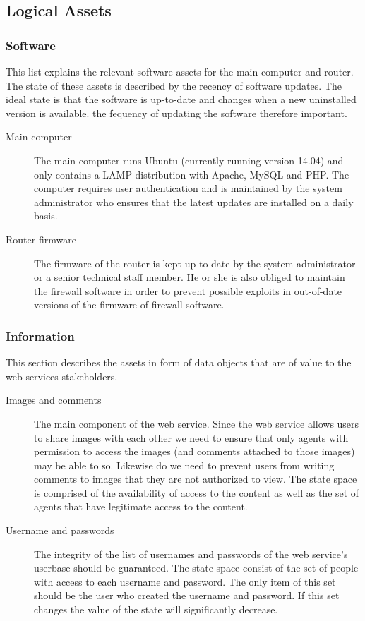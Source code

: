 \documentclass{article}
\begin{document}
\subsection*{Logical Assets}

\subsubsection*{Software}
This list explains the relevant software assets for the main computer and router. The state of these assets is described by the recency of software updates. The ideal state is that the software is up-to-date and changes when a new uninstalled version is available. the fequency of updating the software therefore important. 

\begin{description}
	\item[Main computer]
	The main computer runs Ubuntu (currently running version 14.04) and only contains a LAMP distribution with Apache, MySQL and PHP. The computer requires user authentication and is maintained by the system administrator who ensures that the latest updates are installed on a daily basis. 
	\item[Router firmware]
	The firmware of the router is kept up to date by the system administrator or a senior technical staff member. He or she is also obliged to maintain the firewall software in order to prevent possible exploits in out-of-date versions of the firmware of firewall software. 

\end{description}

\subsubsection*{Information}
This section describes the assets in form of data objects that are of value to the web services stakeholders.


\begin{description}
	\item[Images and comments] 
	The main component of the web service. Since the web service allows users to share images with each other we need to ensure that only agents with permission to access the images (and comments attached to those images) may be able to so. Likewise do we need to prevent users from writing comments to images that they are not authorized to view. The state space is comprised of the availability of access to the content as well as the set of agents that have legitimate access to the content. 
	
	\item[Username and passwords] 
	The integrity of the list of usernames and passwords of the web service's userbase should be guaranteed. The state space consist of the set of people with access to each username and password. The only item of this set should be the user who created the username and password. If this set changes the value of the state will significantly decrease.
	
\end{description}
\end{document}
